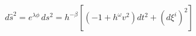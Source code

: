 \begin{equation}
    d\hat{s}^2 = e^{\lambda \phi} \, ds^2 =  h^{-\beta} \left[ \left(
    - 1 + h^\omega v^2 \right) dt^2 + (d\xi^{i})^2\right]
\end{equation}


